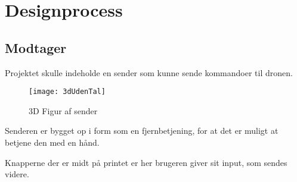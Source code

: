 \documentclass[Main]{subfiles}
\begin{document}
\section{Designprocess}

\subsection{Modtager}

Projektet skulle indeholde en sender som kunne sende kommandoer til dronen.

\begin{figure}[H]
\centering
\texttt{[image: 3dUdenTal]}
\caption{3D Figur af sender}
\label{Fig:3dUdenTal}
\end{figure}


Senderen er bygget op i form som en fjernbetjening, for at det er muligt at betjene den med en hånd.

Knapperne der er midt på printet er her brugeren giver sit input, som sendes videre.
\end{document}
